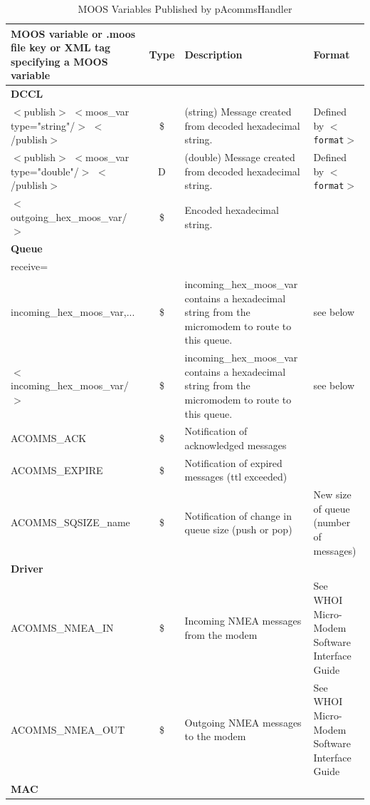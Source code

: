 \documentclass[11pt, letterpaper, oneside]{memoir}
\newcommand{\xmltag}[1]{\texttt{$<$#1$>$}}
\begin{document}
\begin{table}
\centering
\footnotesize
\begin{tabular}{|p{}|c|p{}|p{}|}
\hline MOOS variable or .moos file key or XML tag specifying a MOOS variable & Type & Description & Format \\ \hline 
\hline \textbf{DCCL} &&& \\ \hline\hline
$<$publish$>$ $<$moos\_var type="string"/$>$ $<$/publish$>$& \$ & (string) Message created from decoded hexadecimal string. & Defined by \xmltag{format} \\ \hline
$<$publish$>$ $<$moos\_var type="double"/$>$ $<$/publish$>$& D & (double) Message created from decoded hexadecimal string. & Defined by \xmltag{format} \\ \hline
$<$outgoing\_hex\_moos\_var/$>$ & \$ & Encoded hexadecimal string. &  \\ \hline
\hline \textbf{Queue} &&& \\ \hline\hline
receive= &&&\\incoming\_hex\_moos\_var,... & \$ & incoming\_hex\_moos\_var contains a hexadecimal string from the micromodem to route to this queue. & see below \\ 
\hline $<$incoming\_hex\_moos\_var/$>$ & \$ & incoming\_hex\_moos\_var contains a hexadecimal string from the micromodem to route to this queue. & see below \\  \hline
ACOMMS\_ACK& \$ & Notification of acknowledged messages &  \\ \hline
ACOMMS\_EXPIRE& \$ & Notification of expired messages (ttl exceeded) &  \\ \hline
ACOMMS\_SQSIZE\_name & \$ & Notification of change in queue size (push or pop) & New size of queue (number of messages) \\ \hline
\hline \textbf{Driver} &&& \\ \hline\hline
ACOMMS\_NMEA\_IN & \$ & Incoming NMEA messages from the modem & See WHOI Micro-Modem Software Interface Guide \\ \hline
ACOMMS\_NMEA\_OUT & \$ & Outgoing NMEA messages to the modem & See WHOI Micro-Modem Software Interface Guide \\ \hline
\hline \textbf{MAC} &&& \\ \hline\hline
 \end{tabular}
 \caption{MOOS Variables Published by pAcommsHandler} \label{tab:pAcommsHandler:publish}
\end{table}
\end{document}
